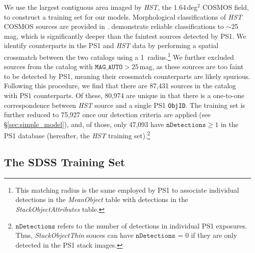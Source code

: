 \documentclass[twocolumn, dvipdfmx]{aastex62}
\begin{document}
\begin{CJK*}{UTF8}{gbsn}
We use the largest contiguous area imaged by \textit{HST}, the 1.64\,deg$^2$
COSMOS field, to construct a training set for our models. Morphological
classifications of \textit{HST} COSMOS sources are provided in
\citet{Leauthaud07}. \citeauthor{Leauthaud07} demonstrate reliable
classifications to $\sim$25\,mag, which is significantly deeper than the
faintest sources detected by PS1. We identify counterparts in the PS1 and
\textit{HST} data by performing a spatial crossmatch between the two catalogs
using a 1\arcsec\ radius.\footnote{This matching radius is the same employed
by PS1 to associate individual detections in the \textit{MeanObject} table
with detections in the \textit{StackObjectAttributes} table.} We further
excluded sources from the \citet{Leauthaud07} catalog with
$\texttt{MAG\_AUTO} > 25$\,mag, as these sources are too faint to be detected
by PS1, meaning their crossmatch counterparts are likely spurious. Following
this procedure, we find that there are 87,431 sources in the
\citet{Leauthaud07} catalog with PS1 counterparts. Of these, 80,974 are
unique in that there is a one-to-one correspondence between \textit{HST}
source and a single PS1 \texttt{ObjID}. The training set is further reduced
to 75,927 once our detection criteria are applied (see
\S\ref{sec:simple_model}), and, of those, only 47,093 have
$\texttt{nDetections} \ge 1$ in the PS1 database (hereafter, the \textit{HST}
training set).\footnote{$\texttt{nDetections}$ refers to the number of
detections in individual PS1 exposures. Thus, \textit{StackObjectThin} souces
can have $\texttt{nDetections}$ = 0 if they are only detected in the PS1
stack images.}

\subsection{The SDSS Training Set}\label{sec:sdss}


\end{CJK*}
\end{document}
